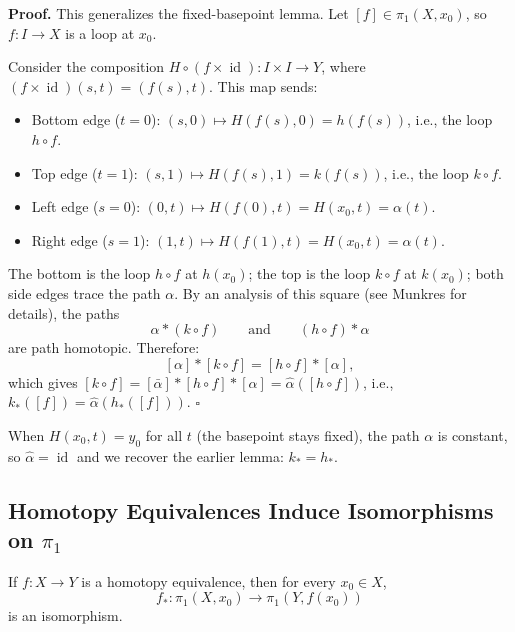 \documentclass[11pt]{report}
\renewenvironment{proof}[1][Proof]{\noindent\textbf{#1.} }{\hfill$\square$\par\vspace{5pt}}
\begin{document}
\begin{proof}
This generalizes the fixed-basepoint lemma. Let $[f] \in \pi_1(X, x_0)$, so $f: I \to X$ is a loop at $x_0$.

Consider the composition $H \circ (f \times \operatorname{id}): I \times I \to Y$, where $(f \times \operatorname{id})(s, t) = (f(s), t)$. This map sends:
\begin{itemize}[nosep]
    \item Bottom edge ($t = 0$): $(s, 0) \mapsto H(f(s), 0) = h(f(s))$, i.e., the loop $h \circ f$.
    \item Top edge ($t = 1$): $(s, 1) \mapsto H(f(s), 1) = k(f(s))$, i.e., the loop $k \circ f$.
    \item Left edge ($s = 0$): $(0, t) \mapsto H(f(0), t) = H(x_0, t) = \alpha(t)$.
    \item Right edge ($s = 1$): $(1, t) \mapsto H(f(1), t) = H(x_0, t) = \alpha(t)$.
\end{itemize}
The bottom is the loop $h \circ f$ at $h(x_0)$; the top is the loop $k \circ f$ at $k(x_0)$; both side edges trace the path $\alpha$. By an analysis of this square (see Munkres for details), the paths
\[\alpha * (k \circ f) \qquad \text{and} \qquad (h \circ f) * \alpha\]
are path homotopic. Therefore:
\[[\alpha] * [k \circ f] = [h \circ f] * [\alpha],\]
which gives $[k \circ f] = [\bar{\alpha}] * [h \circ f] * [\alpha] = \hat{\alpha}([h \circ f])$, i.e., $k_*([f]) = \hat{\alpha}(h_*([f]))$.
\end{proof}

\begin{rembox}
When $H(x_0, t) = y_0$ for all $t$ (the basepoint stays fixed), the path $\alpha$ is constant, so $\hat{\alpha} = \operatorname{id}$ and we recover the earlier lemma: $k_* = h_*$.
\end{rembox}

\subsection{Homotopy Equivalences Induce Isomorphisms on \texorpdfstring{$\pi_1$}{π₁}}

\begin{thmbox}
If $f: X \to Y$ is a homotopy equivalence, then for every $x_0 \in X$,
\[f_*: \pi_1(X, x_0) \to \pi_1(Y, f(x_0))\]
is an isomorphism.
\end{thmbox}
\end{document}
